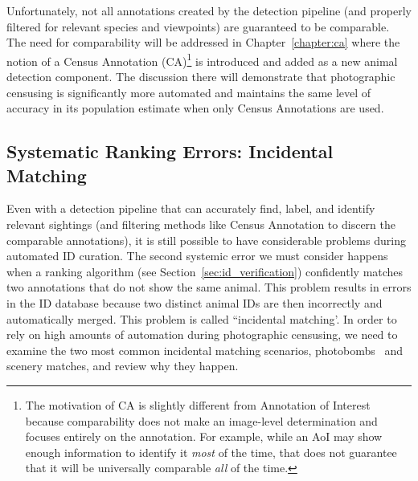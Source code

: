 Unfortunately, not all annotations created by the detection pipeline (and properly filtered for relevant species and viewpoints) are guaranteed to be comparable.  The need for comparability will be addressed in Chapter~\ref{chapter:ca} where the notion of a Census Annotation (CA)\footnote{The motivation of CA is slightly different from Annotation of Interest because comparability does not make an image-level determination and focuses entirely on the annotation.  For example, while an AoI may show enough information to identify it \textit{most} of the time, that does not guarantee that it will be universally comparable \textit{all} of the time.} is introduced and added as a new animal detection component.  The discussion there will demonstrate that photographic censusing is significantly more automated and maintains the same level of accuracy in its population estimate when only Census Annotations are used.

\subsection{Systematic Ranking Errors: Incidental Matching}

Even with a detection pipeline that can accurately find, label, and identify relevant sightings (and filtering methods like Census Annotation to discern the comparable annotations), it is still possible to have considerable problems during automated ID curation.  The second systemic error we must consider happens when a ranking algorithm (see Section~\ref{sec:id_verification}) confidently matches two annotations that do not show the same animal.  This problem results in errors in the ID database because two distinct animal IDs are then incorrectly and automatically merged.  This problem is called ``incidental matching'.  In order to rely on high amounts of automation during photographic censusing, we need to examine the two most common incidental matching scenarios, photobombs~\cite{crall_identifying_2017} and scenery matches, and review why they happen.

